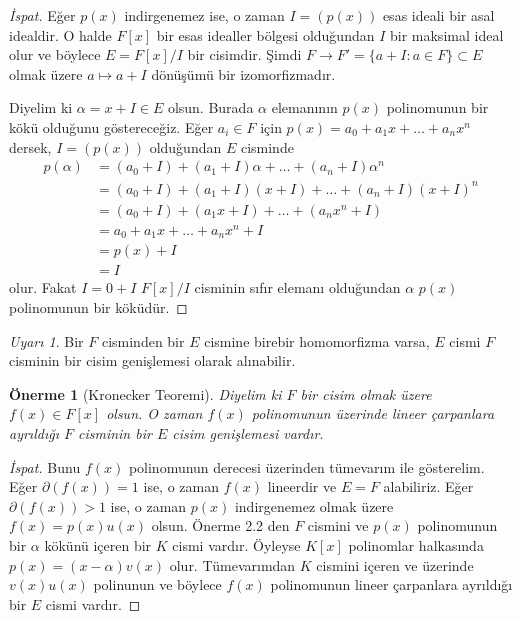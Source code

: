 \documentclass[draft]{article}
\newtheorem{prop}[thm]{Önerme}
\theoremstyle{definition}
\theoremstyle{remark}
\newtheorem{rem}{Uyarı}[section]
\begin{document}
			\begin{proof}[İspat]
			    Eğer $p(x)$ indirgenemez ise, o zaman $I = (p(x))$ esas ideali bir asal idealdir. O halde $F[x]$ bir esas idealler bölgesi olduğundan $I$ bir maksimal ideal olur ve böylece $E = F[x]/I$ bir cisimdir. Şimdi $F \to F' = \{a + I : a \in F\} \subset E$ olmak üzere $a \mapsto a + I$ dönüşümü bir izomorfizmadır.\par
			    Diyelim ki $\alpha = x + I \in E$ olsun. Burada $\alpha$ elemanının $p(x)$ polinomunun bir kökü olduğunu göstereceğiz. Eğer $a_i \in F$ için $p(x) = a_0 + a_1x + \dots + a_nx^n$ dersek, $I = (p(x))$ olduğundan $E$ cisminde
				\begin{align*}
					p(\alpha) &= (a_0 + I) + (a_1 + I)\alpha + \dots + (a_n + I)\alpha^n\\
					&= (a_0 + I) + (a_1 + I)(x + I) + \dots + (a_n + I)(x + I)^n\\
					&= (a_0 + I) + (a_1x + I) + \dots + (a_nx^n + I)\\
					&= a_0 + a_1x + \dots + a_nx^n + I\\
					&= p(x) + I\\
					&= I
				\end{align*}
				olur. Fakat $I = 0 + I$ $F[x]/I$ cisminin sıfır elemanı olduğundan $\alpha$ $p(x)$ polinomunun bir köküdür.
			\end{proof}
			
			\begin{rem}
			    Bir $F$ cisminden bir $E$ cismine birebir homomorfizma varsa, $E$ cismi $F$ cisminin bir cisim genişlemesi olarak alınabilir.
			\end{rem}
			
			\begin{prop}[Kronecker Teoremi]
			    Diyelim ki $F$ bir cisim olmak üzere $f(x) \in F[x]$ olsun. O zaman $f(x)$ polinomunun üzerinde lineer çarpanlara ayrıldığı $F$ cisminin bir $E$ cisim genişlemesi vardır.
			\end{prop}
			
			\begin{proof}[İspat]
			    Bunu $f(x)$ polinomunun derecesi üzerinden tümevarım ile gösterelim. Eğer $\partial(f(x)) = 1$ ise, o zaman $f(x)$ lineerdir ve $E = F$ alabiliriz. Eğer $\partial(f(x)) > 1$ ise, o zaman $p(x)$ indirgenemez olmak üzere $f(x) = p(x)u(x)$ olsun. Önerme 2.2 den $F$ cismini ve $p(x)$ polinomunun bir $\alpha$ kökünü içeren bir $K$ cismi vardır. Öyleyse $K[x]$ polinomlar halkasında $p(x) = (x - \alpha)v(x)$ olur. Tümevarımdan $K$ cismini içeren ve üzerinde $v(x)u(x)$ polinunun ve böylece $f(x)$ polinomunun lineer çarpanlara ayrıldığı bir $E$ cismi vardır.
			\end{proof}
			
\end{document}
